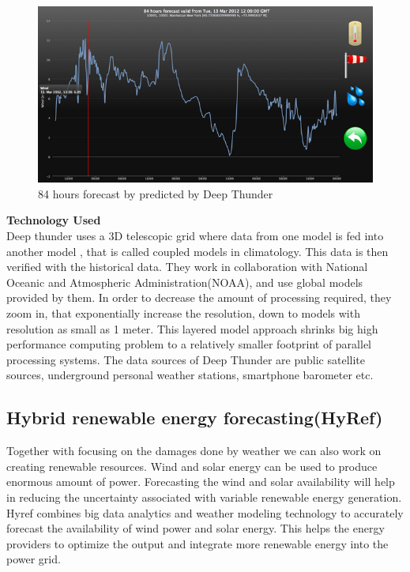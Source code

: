 \documentclass[sigconf]{acmart}
\begin{document}
\begin{figure}
\includegraphics{images/Deep thunder.png}
\caption{84 hours forecast by predicted by Deep Thunder }
\end{figure}


\textbf{Technology Used} \\

Deep thunder uses a 3D telescopic grid where data from one model is fed into another model , that is called coupled models in climatology. This data is then verified with the historical data. They work in collaboration with National Oceanic and Atmospheric Administration(NOAA), and use global models provided by them. In order to decrease the amount of processing required, they zoom in, that exponentially increase the resolution, down to models with resolution as small as 1 meter. This layered model approach shrinks big high performance computing problem to a relatively smaller footprint of parallel processing systems. The data sources of Deep Thunder are public satellite sources, underground personal weather stations, smartphone barometer etc.\cite{Deep01}


\subsection{Hybrid renewable energy forecasting(HyRef)}


Together with focusing on the damages done by weather we can also work on creating renewable resources. Wind and solar energy can be used to produce enormous amount of power. Forecasting the wind and solar availability will help in reducing the uncertainty associated with variable renewable energy generation.
Hyref combines big data analytics and weather modeling technology to accurately forecast the availability of wind power and solar energy. This helps the  energy providers to optimize the output and integrate more renewable energy into the power grid.\cite{Hyref02}\\
\end{document}
